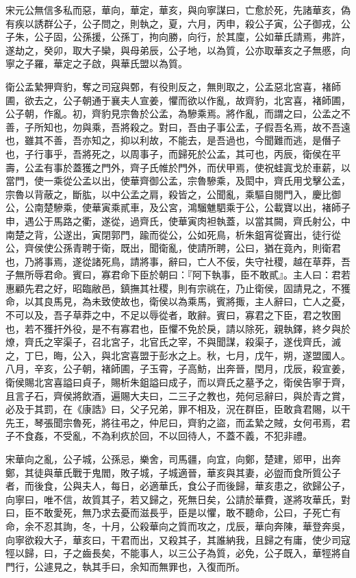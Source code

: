 \begin{pinyinscope}
宋元公無信多私而惡，華向，華定，華亥，與向寧謀曰，亡愈於死，先諸華亥，偽有疾以誘群公子，公子問之，則執之，夏，六月，丙申，殺公子寅，公子御戎，公子朱，公子固，公孫援，公孫丁，拘向勝，向行，於其廩，公如華氏請焉，弗許，遂劫之，癸卯，取大子欒，與母弟辰，公子地，以為質，公亦取華亥之子無慼，向寧之子羅，華定之子啟，與華氏盟以為質。

衛公孟縶狎齊豹，奪之司寇與鄄，有役則反之，無則取之，公孟惡北宮喜，褚師圃，欲去之，公子朝通于襄夫人宣姜，懼而欲以作亂，故齊豹，北宮喜，褚師圃，公子朝，作亂。初，齊豹見宗魯於公孟，為驂乘焉。將作亂，而謂之曰，公孟之不善，子所知也，勿與乘，吾將殺之。對曰，吾由子事公孟，子假吾名焉，故不吾遠也，雖其不善，吾亦知之，抑以利故，不能去，是吾過也，今聞難而逃，是僭子也，子行事乎，吾將死之，以周事子，而歸死於公孟，其可也，丙辰，衛侯在平壽，公孟有事於蓋獲之門外，齊子氏帷於門外，而伏甲焉，使祝蛙寘戈於車薪，以當門，使一乘從公孟以出，使華齊御公孟，宗魯驂乘，及閎中，齊氏用戈擊公孟，宗魯以背蔽之，斷肱，以中公孟之肩，殺皆之，公聞亂，乘驅自閱門入，慶比御公，公南楚驂乘，使華寅乘貳車，及公宮，鴻騮魋駟乘于公，公載寶以出，褚師子申，遇公于馬路之衢，遂從，過齊氏，使華寅肉袒執蓋，以當其闕，齊氏射公，中南楚之背，公遂出，寅閉郭門，踰而從公，公如死鳥，析朱鉏宵從竇出，徒行從公，齊侯使公孫青聘于衛，既出，聞衛亂，使請所聘，公曰，猶在竟內，則衛君也，乃將事焉，遂從諸死鳥，請將事，辭曰，亡人不佞，失守社稷，越在草莽，吾子無所辱君命。賓曰，寡君命下臣於朝曰：『阿下執事，臣不敢貳』。主人曰：君若惠顧先君之好，昭臨敝邑，鎮撫其社稷，則有宗祧在，乃止衛侯，固請見之，不獲命，以其良馬見，為未致使故也，衛侯以為乘馬，賓將掫，主人辭曰，亡人之憂，不可以及，吾子草莽之中，不足以辱從者，敢辭。賓曰，寡君之下臣，君之牧圉也，若不獲扞外役，是不有寡君也，臣懼不免於戾，請以除死，親執鐸，終夕與於燎，齊氏之宰渠子，召北宮子，北官氏之宰，不與聞謀，殺渠子，遂伐齊氏，滅之，丁巳，晦，公入，與北宮喜盟于彭水之上。秋，七月，戊午，朔，遂盟國人。八月，辛亥，公子朝，褚師圃，子玉霄，子高魴，出奔晉，閏月，戊辰，殺宣姜，衛侯賜北宮喜謚曰貞子，賜析朱鉏謚曰成子，而以齊氏之墓予之，衛侯告寧于齊，且言子石，齊侯將飲酒，遍賜大夫曰，二三子之教也，苑何忌辭曰，與於青之賞，必及于其罰，在《康誥》曰，父子兄弟，罪不相及，況在群臣，臣敢貪君賜，以干先王，琴張聞宗魯死，將往弔之，仲尼曰，齊豹之盜，而孟縶之賊，女何弔焉，君子不食姦，不受亂，不為利疚於回，不以回待人，不蓋不義，不犯非禮。

宋華向之亂，公子城，公孫忌，樂舍，司馬疆，向宜，向鄭，楚建，郳甲，出奔鄭，其徒與華氏戰于鬼閻，敗子城，子城適晉，華亥與其妻，必盥而食所質公子者，而後食，公與夫人，每日，必適華氏，食公子而後歸，華亥患之，欲歸公子，向寧曰，唯不信，故質其子，若又歸之，死無日矣，公請於華費，遂將攻華氏，對曰，臣不敢愛死，無乃求去憂而滋長乎，臣是以懼，敢不聽命，公曰，子死亡有命，余不忍其詢，冬，十月，公殺華向之質而攻之，戊辰，華向奔陳，華登奔吳，向寧欲殺大子，華亥曰，干君而出，又殺其子，其誰納我，且歸之有庸，使少司寇牼以歸，曰，子之齒長矣，不能事人，以三公子為質，必免，公子既入，華牼將自門行，公遽見之，執其手曰，余知而無罪也，入復而所。


\end{pinyinscope}
